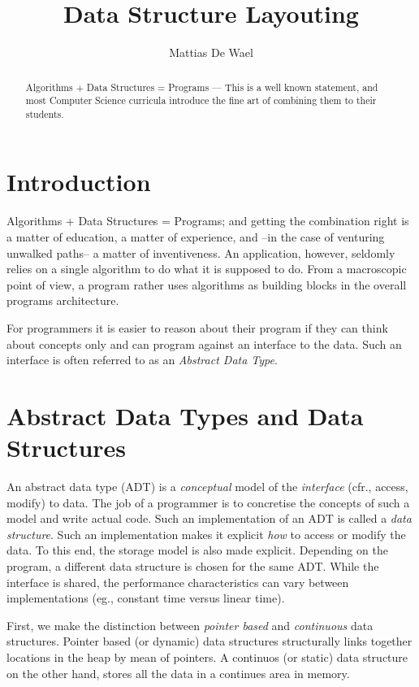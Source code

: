 \documentclass[11pt]{amsart}
\title{Data Structure Layouting}
\author{Mattias De Wael}
\begin{document}
\maketitle

\begin{abstract}
	Algorithms + Data Structures = Programs --- This is a well known statement,
and most Computer Science curricula introduce the fine art of combining them
to their students.
\end{abstract}

\section{Introduction}
Algorithms + Data Structures = Programs; and getting the combination right is
a matter of education, a matter of experience, and --in the case of venturing
unwalked paths-- a matter of inventiveness. An application, however, seldomly
relies on a single algorithm to do what it is supposed to do. From a macroscopic
point of view, a program rather uses algorithms as building blocks in the overall
programs architecture.

For programmers it is easier to reason about their program if they can think
about concepts only and can program against an interface to the data. Such an
interface is often referred to as an \emph{Abstract Data Type}.


\section{Abstract Data Types and Data Structures}
An abstract data type (ADT) is a \emph{conceptual} model of the
\emph{interface} (cfr., access, modify) to data. The job of a programmer is to
concretise the concepts of such a model and write actual code. Such an
implementation of an ADT is called a \emph{data structure}. Such an
implementation makes it explicit \emph{how} to access or modify the data. To
this end, the storage model is also made explicit. Depending on the program, a
different data structure is chosen for the same ADT. While the interface is
shared, the performance characteristics can vary between implementations (eg.,
constant time versus linear time).

First, we make the distinction between \emph{pointer based} and
\emph{continuous} data structures. Pointer based (or dynamic) data structures
structurally links together locations in the heap by mean of pointers. A
continuos (or static) data structure on the other hand, stores all the data in
a continues area in memory.
\end{document}
